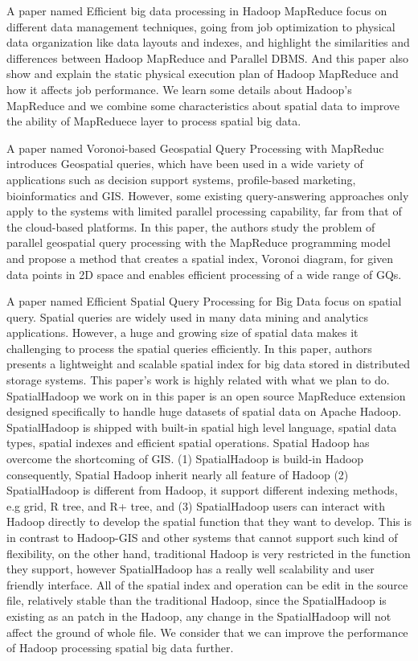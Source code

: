 A paper named Efficient big data processing in Hadoop MapReduce \cite{dittrich2012efficient} focus on different data management techniques, going from job optimization to physical data organization like data layouts and indexes, and highlight the similarities and differences between Hadoop MapReduce and Parallel DBMS.  And this paper also show and explain the static physical execution plan of Hadoop MapReduce and how it affects job performance. We learn some details about Hadoop's MapReduce and we combine some characteristics about spatial data to improve the ability of MapReduece layer to process spatial big data. 


A paper named Voronoi-based Geospatial Query Processing with MapReduc \cite{akdogan2010voronoi}
introduces Geospatial queries, which have been used in a wide variety of applications such as decision support systems, profile-based marketing, bioinformatics and GIS. However, some existing query-answering approaches only apply to the systems with limited parallel processing capability, far from that of the cloud-based platforms. In this paper, the authors study the problem of parallel geospatial query processing with the MapReduce programming model and propose a method that creates a spatial index, Voronoi diagram, for given data points in 2D space and enables efficient processing of a wide range of GQs.  

A paper named Efficient Spatial Query Processing for Big Data \cite{lee2014efficient} focus on spatial query. Spatial queries are widely used in many data mining and analytics applications. However, a huge and growing size of spatial data makes it challenging to process the spatial queries efficiently. In this paper, authors presents a lightweight and scalable spatial index for big data stored in distributed storage systems. This paper's work is highly related with what we plan to do. SpatialHadoop we work on in this paper is an open source MapReduce extension designed specifically to handle huge datasets of spatial data on Apache Hadoop. SpatialHadoop is shipped with built-in spatial high level language, spatial data types, spatial indexes and efficient spatial operations. Spatial Hadoop has overcome the shortcoming of GIS. (1) \cite{eldawy2015spatialhadoop} SpatialHadoop is build-in Hadoop consequently, Spatial Hadoop inherit nearly all feature of Hadoop (2) SpatialHadoop is different from Hadoop, it support different indexing methods, e.g grid, R tree, and R+ tree, and (3) SpatialHadoop users can interact with Hadoop directly to develop the spatial function that they want to develop. This is in contrast to Hadoop-GIS and other systems that cannot support such kind of flexibility, on the other hand, traditional Hadoop is very restricted in the function they support, however SpatialHadoop has a really well scalability and user friendly interface. All of the spatial index and operation can be edit in the source file, relatively stable than the traditional Hadoop, since the SpatialHadoop is existing as an patch in the Hadoop, any change in the SpatialHadoop will not affect the ground of whole file. We consider that we can improve the performance of Hadoop processing spatial big data further.


